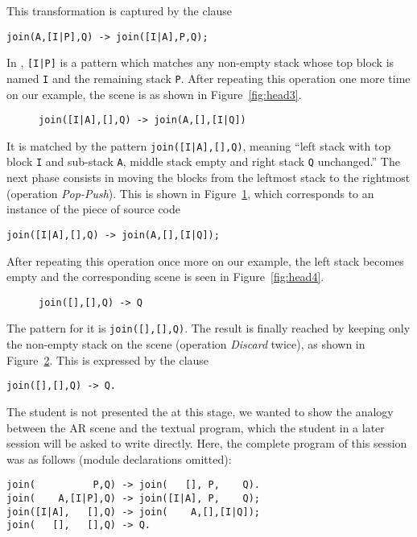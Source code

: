 This transformation is captured by the \erlang clause
{\small
\begin{verbatim}
join(A,[I|P],Q) -> join([I|A],P,Q);
\end{verbatim}
}
\noindent In \erlang, \texttt{[I|P]} is a pattern which matches any
non\hyp{}empty stack whose top block is named \texttt{I} and the
remaining stack \texttt{P}. After repeating this operation one more
time on our example, the scene is as shown in Figure~\ref{fig:head3}.
\begin{figure}[!h]
\centering
{}
\quad
{}
\caption{\texttt{\small join([I|A],[],Q) -> join(A,[],[I|Q])}
\label{fig:clause3}}
\end{figure}
It is matched by the pattern \texttt{join([I|A],[],Q)}, meaning ``left
stack with top block \texttt{I} and sub\hyp{}stack \texttt{A}, middle
stack empty and right stack \texttt{Q} unchanged.'' The next phase
consists in moving the blocks from the leftmost stack to the rightmost
(operation \textsl{Pop\hyp{}Push}). This is shown in
Figure~\ref{fig:clause3}, which corresponds to an instance of the
piece of source code 
{\small
\begin{verbatim}
join([I|A],[],Q) -> join(A,[],[I|Q]);
\end{verbatim}
}
\noindent After repeating this operation once more on our example, the
left stack becomes empty and the corresponding scene is seen in
Figure~\ref{fig:head4}. 
\begin{figure}[!h]
\centering
{}
\quad
{}
\caption{\texttt{\small join([],[],Q) -> Q}}
\label{fig:clause4}
\end{figure}
The \erlang pattern for it is \texttt{join([],[],Q)}. The result is
finally reached by keeping only the non\hyp{}empty stack on the scene
(operation \textsl{Discard} twice), as shown in
Figure~\ref{fig:clause4}. This is expressed by the clause
{\small
\begin{verbatim}
join([],[],Q) -> Q.
\end{verbatim}
} 
The student is not presented the \erlang at this stage, we wanted to
show the analogy between the AR scene and the textual program, which
the student in a later session will be asked to write directly. Here,
the complete \erlang program of this session was as follows (module
declarations omitted):
{\small
\begin{verbatim}
join(          P,Q) -> join(   [], P,    Q).
join(    A,[I|P],Q) -> join([I|A], P,    Q);
join([I|A],   [],Q) -> join(    A,[],[I|Q]);
join(   [],   [],Q) -> Q.
\end{verbatim}
}

